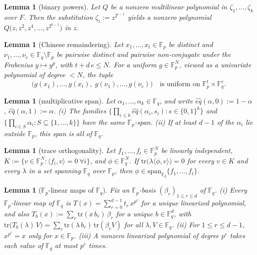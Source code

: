\documentclass{article}
\newcommand{\Fp}{\mathbb{F}_p}
\newcommand{\Fq}{\mathbb{F}_q}
\newcommand{\extdeg}{d}
\newtheorem{lemma}[theorem]{Lemma}
\theoremstyle{definition}
\begin{document}
\begin{lemma}[binary powers]\label{lem:binpow}
Let $Q$ be a nonzero multilinear polynomial in $\zeta_1, \dots, \zeta_k$ over $F$. Then the substitution $\zeta_i := z^{2^{i-1}}$ yields a nonzero polynomial $Q\big(z, z^2, z^4, \dots, z^{2^{k-1}}\big)$ in $z$.
\end{lemma}

\begin{lemma}[Chinese remaindering]\label{lem:crt}
Let $x_1, \dots, x_{t} \in \Fp$ be distinct and $\nu_1, \dots, \nu_e \in \Fq \setminus \Fp$ be pairwise distinct and pairwise non-conjugate under the Frobenius $y \mapsto y^p$, with $t + \extdeg\, e \leq N$. For a uniform $g \in \Fp^{N}$, viewed as a univariate polynomial of degree $< N$, the tuple
\[
\big(g(x_1), \dots, g(x_{t}),\; g(\nu_1), \dots, g(\nu_e)\big) \quad \text{is uniform on } \Fp^{t} \times \Fq^{e} .
\]
\end{lemma}

\begin{lemma}[multiplicative span]\label{lem:span}
Let $\alpha_1, \dots, \alpha_k \in \Fq$, and write $\hat{eq}(\alpha, 0) := 1 - \alpha$, $\hat{eq}(\alpha, 1) := \alpha$. (i) The families $\big\{\prod_{i \leq k} \hat{eq}(\alpha_i, s_i) : s \in \{0,1\}^k\big\}$ and $\big\{\prod_{i \in S} \alpha_i : S \subseteq \{1, \dots, k\}\big\}$ have the same $\Fp$-span. (ii) If at least $\extdeg - 1$ of the $\alpha_i$ lie outside $\Fp$, this span is all of $\Fq$.
\end{lemma}

\begin{lemma}[trace orthogonality]\label{lem:traceorth}
Let $f_1, \dots, f_t \in \Fp^N$ be linearly independent, $K := \{v \in \Fp^N : \langle f_i, v \rangle = 0 \ \forall i\}$, and $\phi \in \Fq^N$. If $\mathrm{tr}\big(\lambda \langle \phi, v \rangle\big) = 0$ for every $v \in K$ and every $\lambda$ in a set spanning $\Fq$ over $\Fp$, then $\phi \in \mathrm{span}_{\Fq}\{f_1, \dots, f_t\}$.
\end{lemma}

\begin{lemma}[$\Fp$-linear maps of $\Fq$]\label{lem:linearized}
Fix an $\Fp$-basis $(\beta_r)_{1 \leq r \leq \extdeg}$ of $\Fq$. (i) Every $\Fp$-linear map of $\Fq$ is $T(x) = \sum_{r=0}^{\extdeg-1} t_r\, x^{p^r}$ for a unique \emph{linearized polynomial}, and also $T_b(x) := \sum_{r} \mathrm{tr}(x\, b_r)\, \beta_r$ for a unique $b \in \Fq^{\extdeg}$, with $\mathrm{tr}\big(T_b(\lambda)\, V\big) = \sum_r \mathrm{tr}(\lambda\, b_r)\, \mathrm{tr}(\beta_r V)$ for all $\lambda, V \in \Fq$. (ii) For $1 \leq r \leq \extdeg - 1$, $x^{p^r} = x$ only for $x \in \Fp$. (iii) A nonzero linearized polynomial of degree $p^e$ takes each value of $\Fq$ at most $p^e$ times.
\end{lemma}
\end{document}

